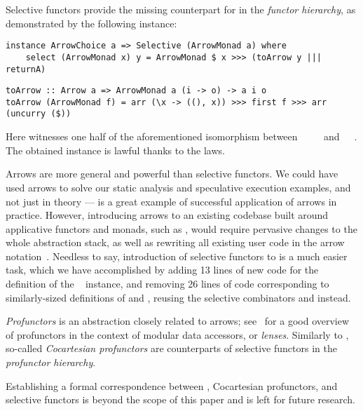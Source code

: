 \noindent
Selective functors provide the missing counterpart for  in the
\emph{functor hierarchy}, as demonstrated by the following instance:

\vspace{1mm}
\begin{verbatim}
instance ArrowChoice a => Selective (ArrowMonad a) where
    select (ArrowMonad x) y = ArrowMonad $ x >>> (toArrow y ||| returnA)
\end{verbatim}
\vspace{1mm}
\begin{verbatim}
toArrow :: Arrow a => ArrowMonad a (i -> o) -> a i o
toArrow (ArrowMonad f) = arr (\x -> ((), x)) >>> first f >>> arr (uncurry ($))
\end{verbatim}
\vspace{1mm}

\noindent
Here  witnesses one half of the aforementioned isomorphism between
~\hs{()}~\hs{(}~\hs{->}~ and~~~. The
obtained  instance is lawful thanks to the  laws.

Arrows are more general and powerful than selective functors. We could have used
arrows to solve our static analysis and speculative execution examples, and not
just in theory --- \Dune is a great example of successful application of arrows
in practice. However, introducing arrows to an existing codebase built around
applicative functors and monads, such as \Haxl, would require pervasive changes
to the whole abstraction stack, as well as rewriting all existing \Haxl user
code in the arrow notation~\citep{paterson2001new}. Needless to say,
introduction of selective functors to \Haxl is a much easier task, which we have
accomplished by adding 13 lines of new code for the definition of the
~ instance, and removing 26 lines of code corresponding
to similarly-sized definitions of  and , reusing the selective
combinators \hs{<||>} and \hs{<&&>} instead.

\emph{Profunctors} is an abstraction closely related to arrows;
see~\citep{pickering2017profunctor} for a good overview of profunctors in the
context of modular data accessors, or \emph{lenses}. Similarly to
, so-called \emph{Cocartesian profunctors} are counterparts of
selective functors in the \emph{profunctor hierarchy}.

Establishing a formal correspondence between , Cocartesian
profunctors, and selective functors is beyond the scope of this paper and is
left for future research.

